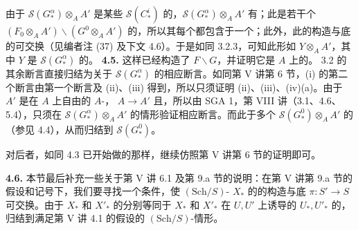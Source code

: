 由于 $\mathscr S(G^\alpha_*)\otimes_A A'$ 是某些 $\mathscr S(C^i_*)$ 的，$\mathscr S(G^\alpha_*)\otimes_A A'$ 有；此是若干个 $(F_0\otimes_A A')\backslash(G^0\otimes_A A')$ 的，所以其每个都包含于一个；此外，此的构造与底的可交换（见编者注 (37) 及下文 4.6）。于是如同 3.2.3，可知此形如 $Y\otimes_A A'$，其中 $Y$ 是 $\mathscr S(G^\alpha_*)$ 的。
\textbf{4.5.} 这样已经构造了 $F\backslash G$，并证明它是 $A$ 上的。 3.2 的其余断言直接归结为关于 $\mathscr S(G^\alpha_*)$ 的相应断言。如同第 V 讲第 6 节，(i) 的第二个断言由第一个断言及 (ii)、(iii) 得到，所以只须证明 (ii)、(iii)、(iv)(a)。由于 $A'$ 是在 $A$ 上自由的 $A$-， $A\to A'$ 且，所以由 SGA 1，第 VIII 讲（3.1、4.6、5.4），只须在 $\mathscr S(G^\alpha_*)\otimes_A A'$ 的情形验证相应断言。而此于多个 $\mathscr S(G^0_*)\otimes_A A'$ 的（参见 4.4），从而归结到 $\mathscr S(G^0_*)$。

对后者，如同 4.3 已开始做的那样，继续仿照第 V 讲第 6 节的证明即可。

\textbf{4.6.} 本节最后补充一些关于第 V 讲 6.1 及第 9.a 节的说明：在第 V 讲第 9.a 节的假设和记号下，我们要寻找一个条件，使 $(\mathrm{Sch}/S)$- $X_*$ 的的构造与底 $\pi:S'\to S$ 可交换。由于 $X_*$ 和 $X'_*$ 的分别等同于 $X_*$ 和 $X'_*$ 在 $U,U'$ 上诱导的 $U_*,U'_*$ 的，归结到满足第 V 讲 4.1 的假设的 $(\mathrm{Sch}/S)$-情形。

